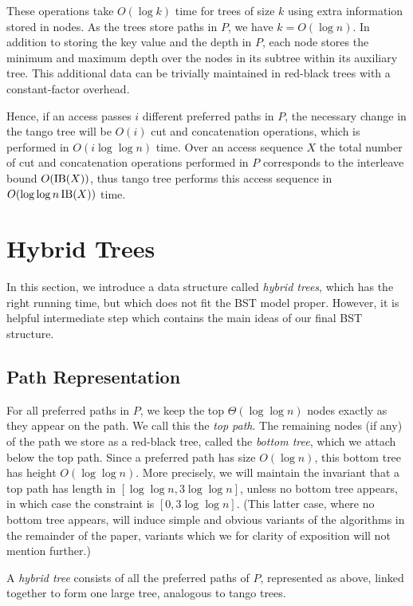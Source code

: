 \documentclass[letterpaper,11pt]{article}
\newcommand{\toppath}{top path}
\newcommand{\bottomtree}{bottom tree}
\begin{document}
These operations take $O(\log k)$ time for trees of size $k$ using extra
information stored in nodes. As the trees store paths in $P$, we have $k =
O(\log n)$. In addition to storing the key value and the depth in $P$, each
node stores the minimum and maximum depth over the nodes in its subtree
within its auxiliary tree. This additional data can be trivially maintained
in red-black trees with a constant-factor overhead.

Hence, if an access passes $i$ different preferred paths in $P$, the
necessary change in the tango tree will be $O(i)$ cut and concatenation
operations, which is performed in $O(i\log \log n)$ time. Over an access
sequence $X$ the total number of cut and concatenation operations performed
in $P$ corresponds to the interleave bound $O({\rm IB}(X))$, thus tango
tree performs this access sequence in $O(\log \log n \, {\rm IB}(X))$ time.

\section{Hybrid Trees}
\label{hybrid}

In this section, we introduce a data structure called \emph{hybrid trees},
which has the right running time, but which does not fit the BST model
proper. However, it is helpful intermediate step which contains the main
ideas of our final BST structure.

\subsection{Path Representation}

For all preferred paths in $P$, we keep the top $\Theta(\log \log n)$ nodes
exactly as they appear on the path. We call this the \emph{\toppath{}}. The
remaining nodes (if any) of the path we store as a red-black tree, called
the \emph{\bottomtree}, which we attach below the \toppath{}. Since a
preferred path has size $O(\log n)$, this \bottomtree{} has height $O(\log
\log n)$.
More precisely, we will maintain the invariant that a \toppath{} has length
in $[\log\log n, 3\log\log n]$, unless no \bottomtree{} appears, in
which case the constraint is  $[0,3\log\log n]$. (This latter
case, where no \bottomtree{} appears, will induce simple and obvious
variants of the algorithms in the remainder of the paper, variants which we
for clarity of exposition will not mention further.)

A \emph{hybrid tree} consists of all the preferred paths of $P$,
represented as above, linked together to form one large tree, analogous
to tango trees.
\end{document}
